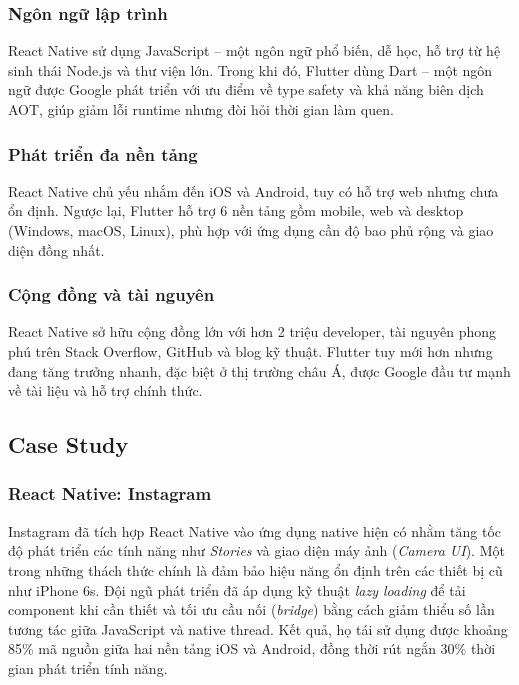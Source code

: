 \subsubsection{Ngôn ngữ lập trình}

  React Native sử dụng JavaScript – một ngôn ngữ phổ biến, dễ học, hỗ trợ từ hệ sinh thái Node.js và thư viện lớn. Trong khi đó, Flutter dùng Dart – một ngôn ngữ được Google phát triển với ưu điểm về type safety và khả năng biên dịch AOT, giúp giảm lỗi runtime nhưng đòi hỏi thời gian làm quen.

\subsubsection{Phát triển đa nền tảng}

  React Native chủ yếu nhắm đến iOS và Android, tuy có hỗ trợ web nhưng chưa ổn định. Ngược lại, Flutter hỗ trợ 6 nền tảng gồm mobile, web và desktop (Windows, macOS, Linux), phù hợp với ứng dụng cần độ bao phủ rộng và giao diện đồng nhất.

\subsubsection{Cộng đồng và tài nguyên}

  React Native sở hữu cộng đồng lớn với hơn 2 triệu developer, tài nguyên phong phú trên Stack Overflow, GitHub và blog kỹ thuật. Flutter tuy mới hơn nhưng đang tăng trưởng nhanh, đặc biệt ở thị trường châu Á, được Google đầu tư mạnh về tài liệu và hỗ trợ chính thức.

\subsection{Case Study}
\renewcommand{\labelitemi}{--}    
\subsubsection{React Native: Instagram}

  Instagram đã tích hợp React Native vào ứng dụng native hiện có nhằm tăng tốc độ phát triển các tính năng như \textit{Stories} và giao diện máy ảnh (\textit{Camera UI}). Một trong những thách thức chính là đảm bảo hiệu năng ổn định trên các thiết bị cũ như iPhone 6s. Đội ngũ phát triển đã áp dụng kỹ thuật \textit{lazy loading} để tải component khi cần thiết và tối ưu cầu nối (\textit{bridge}) bằng cách giảm thiểu số lần tương tác giữa JavaScript và native thread. Kết quả, họ tái sử dụng được khoảng 85\% mã nguồn giữa hai nền tảng iOS và Android, đồng thời rút ngắn 30\% thời gian phát triển tính năng.

